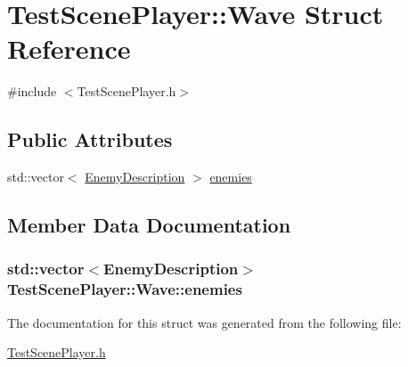 \hypertarget{struct_test_scene_player_1_1_wave}{
\section{TestScenePlayer::Wave Struct Reference}
\label{da/dfc/struct_test_scene_player_1_1_wave}
}


{\ttfamily \#include $<$TestScenePlayer.h$>$}

\subsection*{Public Attributes}
\begin{DoxyCompactItemize}
\item 
std::vector$<$ \hyperlink{struct_test_scene_player_1_1_enemy_description}{EnemyDescription} $>$ \hyperlink{struct_test_scene_player_1_1_wave_a20b6de934abeadb2b1c2f987bbce8b42}{enemies}
\end{DoxyCompactItemize}


\subsection{Member Data Documentation}
\hypertarget{struct_test_scene_player_1_1_wave_a20b6de934abeadb2b1c2f987bbce8b42}{
\subsubsection[{enemies}]{\setlength{\rightskip}{0pt plus 5cm}std::vector$<${\bf EnemyDescription}$>$ {\bf TestScenePlayer::Wave::enemies}}}
\label{da/dfc/struct_test_scene_player_1_1_wave_a20b6de934abeadb2b1c2f987bbce8b42}


The documentation for this struct was generated from the following file:\begin{DoxyCompactItemize}
\item 
\hyperlink{_test_scene_player_8h}{TestScenePlayer.h}\end{DoxyCompactItemize}
